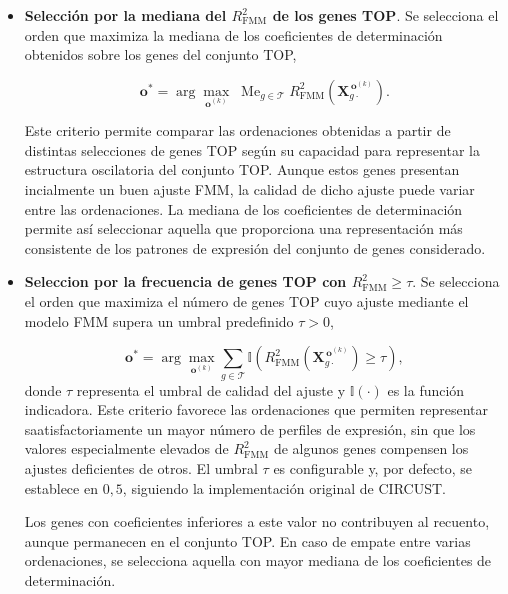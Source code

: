 \documentclass[12pt, a4paper]{report}
\begin{document}
\begin{itemize}

\item \textbf{Selección por la mediana del \(R^2_{\mathrm{FMM}}\) de los genes TOP}. Se selecciona el orden que maximiza la mediana de los coeficientes de determinación obtenidos sobre los genes del conjunto TOP,

\[
\mathbf{o}^{*}
=
\arg\max_{\mathbf{o}^{(k)}}\;
\operatorname{Me}_{g\in\mathcal{T}}
R^2_{\mathrm{FMM}}\!\left(\mathbf{X}_{g\cdot}^{\,\mathbf{o}^{(k)}}\right).
\]

Este criterio permite comparar las ordenaciones obtenidas a partir de distintas selecciones de genes TOP según su capacidad para representar la estructura oscilatoria del conjunto TOP. Aunque estos genes presentan incialmente un buen ajuste FMM, la calidad de dicho ajuste puede variar entre las ordenaciones. 
La mediana de los coeficientes de determinación permite así seleccionar aquella que proporciona una representación más consistente de los patrones de expresión del conjunto de genes considerado.

\item \textbf{Seleccion por la frecuencia de genes TOP con \(R^2_{\mathrm{FMM}}\geq\tau\)}. Se selecciona el orden que maximiza el número de genes TOP cuyo ajuste mediante el modelo FMM supera un umbral predefinido \(\tau > 0\),

\[
\mathbf{o}^{*}
=
\arg\max_{\mathbf{o}^{(k)}}
\sum_{g\in \mathcal{T}}
\mathbb{I}
\left(
R^2_{\mathrm{FMM}}\!\left(\mathbf{X}_{g\cdot}^{\,\mathbf{o}^{(k)}}\right) \geq \tau
\right),
\]
donde \(\tau\) representa el umbral de calidad del ajuste y \(\mathbb{I}(\cdot)\) es la función indicadora. 
Este criterio favorece las ordenaciones que permiten representar saatisfactoriamente un mayor número de perfiles de expresión, sin que los valores especialmente elevados de \(R^2_{\mathrm{FMM}}\) de algunos genes compensen los ajustes deficientes de otros. El umbral \(\tau\) es configurable y, por defecto, se establece en \(0{,}5\), siguiendo la implementación original de CIRCUST. 

Los genes con coeficientes inferiores a este valor no contribuyen al recuento, aunque permanecen en el conjunto TOP. En caso de empate entre varias ordenaciones, se selecciona aquella con mayor mediana de los coeficientes de determinación.


\end{itemize}
\end{document}
